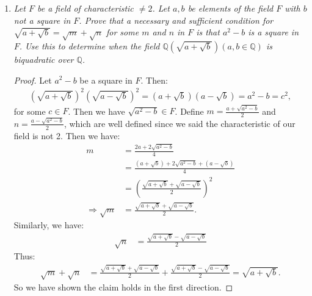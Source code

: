 \documentclass[9pt,reqno,twoside]{amsbook}
\theoremstyle{plain}
\numberwithin{section}{chapter}
\numberwithin{equation}{chapter}
\theoremstyle{definition}
\theoremstyle{remark}
\theoremstyle{plain}
\newcommand{\Q}{\mathbb{Q}}
\newcommand{\bee}{\begin{equation}\begin{aligned}}
\newcommand{\eee}{\end{aligned}\end{equation}}
\newcommand{\fracc}{\frac}
\newcommand{\lpar}{\left(}
\newcommand{\rpar}{\right)}
\begin{document}
\begin{enumerate}[label=\arabic*.]
\begin{proof}
If $D_1D_2$ is a square, we would have $\sqrt{D_1}\sqrt{D_2} = a$ for some integer $a$. Thus $\sqrt{D_1} = \fracc{a}{\sqrt{D_2}}$, and so $F(\sqrt{D_1},\sqrt{D_2}) = F(\sqrt{D_2})$. Then we showed $F(\sqrt{D_2})$ has degree 2 over $F$, so $[F(\sqrt{D_1},\sqrt{D_2}):F] = 2$. 
\end{proof}

\item \textit{Let $F$ be a field of characteristic $\neq 2$. Let $a,b$ be elements of the field $F$ with $b$ not a square in $F$. Prove that a necessary and sufficient condition for $\sqrt{a + \sqrt{b}} = \sqrt{m} + \sqrt{n}$ for some $m$ and $n$ in $F$ is that $a^2 - b$ is a square in $F$. Use this to determine when the field $\Q(\sqrt{a + \sqrt{b}})(a,b \in \Q)$ is biquadratic over $\Q$. }

\begin{proof}
Let $a^2 - b$ be a square in $F$. Then:
\bee
\lpar \sqrt{a + \sqrt{b}} \rpar^2 \lpar \sqrt{a - \sqrt{b}} \rpar^2 = (a + \sqrt{b})(a - \sqrt{b}) = a^2 - b = c^2,
\eee
for some $c \in F$. Then we have $\sqrt{a^2 - b} \in F$. Define $m = \fracc{a + \sqrt{a^2 - b}}{2}$ and $n = \fracc{a - \sqrt{a^2 - b}}{2}$, which are well defined since we said the characteristic of our field is not 2. Then we have:
\bee
m &= \fracc{2a + 2\sqrt{a^2 - b}}{4}\\
&= \fracc{(a + \sqrt{b}) + 2\sqrt{a^2 - b} + (a - \sqrt{b})}{4}\\
&= \lpar \fracc{\sqrt{a + \sqrt{b}} + \sqrt{a - \sqrt{b}}}{2} \rpar^2\\
\Rightarrow \sqrt{m} &= \fracc{\sqrt{a + \sqrt{b}} + \sqrt{a - \sqrt{b}}}{2}.
\eee
Similarly, we have:
\bee
\sqrt{n} &=  \fracc{\sqrt{a + \sqrt{b}} - \sqrt{a - \sqrt{b}}}{2}
\eee
Thus:
\bee
\sqrt{m} + \sqrt{n} &= \fracc{\sqrt{a + \sqrt{b}} + \sqrt{a - \sqrt{b}}}{2} + \fracc{\sqrt{a + \sqrt{b}} - \sqrt{a - \sqrt{b}}}{2} = \sqrt{a + \sqrt{b}}.
\eee
So we have shown the claim holds in the first direction.




\end{proof}
\end{enumerate}
\end{document}
